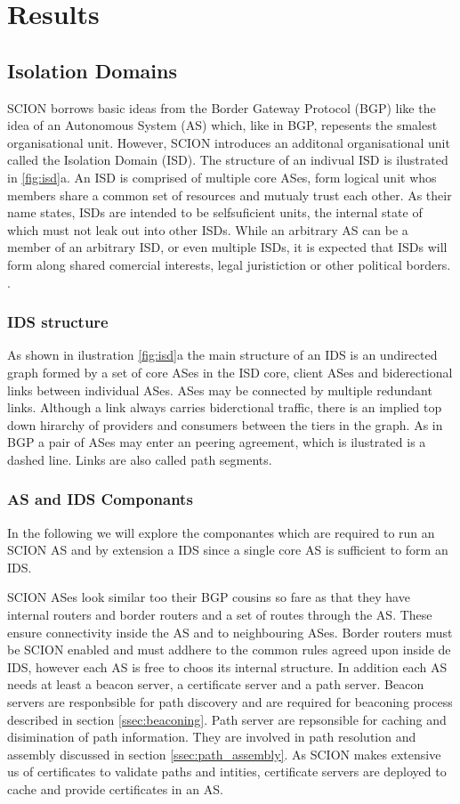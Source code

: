 \documentclass[../eva1_scion.tex]{subfiles}
\begin{document}
    \chapter{Results}
    \section{Isolation Domains}
    SCION borrows basic ideas from the Border Gateway Protocol (BGP) like the idea of an Autonomous System (AS) which, like in BGP, repesents the smalest organisational unit. However, SCION introduces an additonal organisational unit called the Isolation Domain (ISD). The structure of an indivual ISD is ilustrated in \ref{fig:isd}a. An ISD is comprised of multiple core ASes, form logical unit whos members share a common set of resources and mutualy trust each other. As their name states, ISDs are intended to be selfsuficient units, the internal state of which must not leak out into other ISDs. \cite{scion_2011} While an arbitrary AS can be a member of an arbitrary ISD, or even multiple ISDs, it is expected that ISDs will form along shared comercial interests, legal juristiction or other political borders. \cite{scion_2017}.

    \subsection{IDS structure}
    As shown in ilustration \ref{fig:isd}a the main structure of an IDS is an undirected graph formed by a set of core ASes in the ISD core, client ASes and biderectional links between individual ASes. ASes may be connected by multiple redundant links. Although a link always carries biderctional traffic, there is an implied top down hirarchy of providers and consumers between the tiers in the graph. As in BGP a pair of ASes may enter an peering agreement, which is ilustrated is a dashed line. Links are also called path segments.

    \subsection{AS and IDS Componants}
    In the following we will explore the componantes which are required to run an SCION AS and by extension a IDS since a single core AS is sufficient to form an IDS.

    SCION ASes look similar too their BGP cousins so fare as that they have internal routers and border routers and a set of routes through the AS. These ensure connectivity inside the AS and to neighbouring ASes. Border routers must be SCION enabled and must addhere to the common rules agreed upon inside de IDS, however each AS is free to choos its internal structure. In addition each AS needs at least a beacon server, a certificate server and a path server. Beacon servers are responbsible for path discovery and are required for beaconing process described in section \ref{ssec:beaconing}. Path server are repsonsible for caching and disimination of path information. They are involved in path resolution and assembly discussed in section \ref{ssec:path_assembly}. As SCION makes extensive us of certificates to validate paths and intities, certificate servers are deployed to cache and provide certificates in an AS.
    
\end{document}
